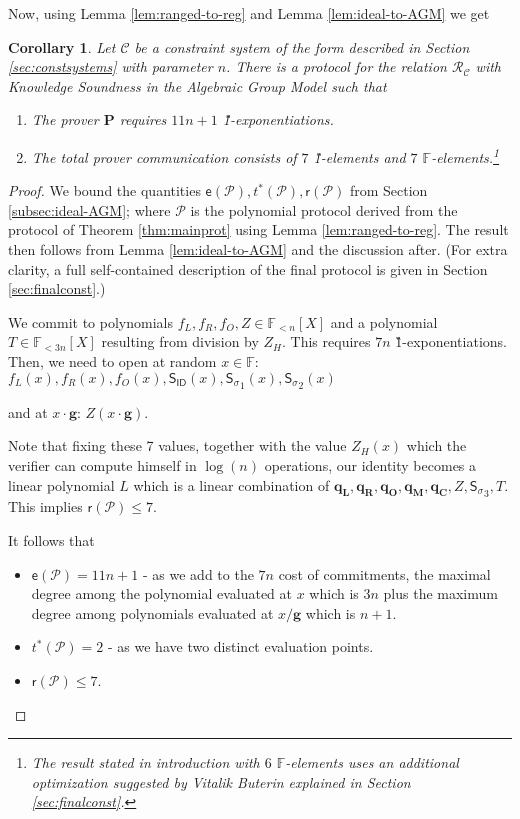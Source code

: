 \documentclass[11pt]{article} %
\newcommand{\F}{\ensuremath{\mathbb F}\xspace}
\newcommand{\proverexp}{\ensuremath{\mathsf{e}}\xspace}
\newcommand{\reducedelems}{\ensuremath{\mathsf{r}}\xspace}
\newcommand{\prv}{\ensuremath{\mathsf{\mathbf{P}}}\xspace}
\newcommand{\rel}{\ensuremath{\mathcal{R}}\xspace}
\newcommand{\hgen}{\ensuremath{\mathbf{g}}\xspace}
\newcommand{\polysofdeg}[1]{\ensuremath{\F_{< #1}[X]}\xspace}
\newcommand{\prot}{\ensuremath{\mathscr{P}}\xspace}
\newcommand{\sigpoly}{\ensuremath{\mathsf{S_{\sigma}}}\xspace}
\newcommand{\idpoly}{\ensuremath{\mathsf{S_{ID}}}\xspace}
\newcommand{\selleft}{\ensuremath{\mathbf{q_L}}\xspace}
\newcommand{\selright}{\ensuremath{\mathbf{q_R}}\xspace}
\newcommand{\selout}{\ensuremath{\mathbf{q_O}}\xspace}
\newcommand{\selmult}{\ensuremath{\mathbf{q_M}}\xspace}
\newcommand{\selconst}{\ensuremath{\mathbf{q_C}}\xspace}
\newcommand{\constsystem}{\ensuremath{\mathscr{C}}\xspace}
\newcommand{\relof}[1]{\ensuremath{\rel_{#1}}\xspace}
\newtheorem{corollary}[lemma]{Corollary}
\begin{document}
 
 Now, using Lemma \ref{lem:ranged-to-reg} and Lemma \ref{lem:ideal-to-AGM} we get
 \begin{corollary}\label{cor:final}
  Let \constsystem be a constraint system of the form described in Section \ref{sec:constsystems} with parameter $n$. There is a protocol for the relation \relof{\constsystem} with Knowledge Soundness in the Algebraic Group Model such that
   \begin{enumerate}
  \item The prover \prv requires $11n+1$ \G1-exponentiations.
  \item The total prover communication consists of $7$ \G1-elements and $7$ \F-elements.\footnote{The result stated in introduction with $6$ \F-elements uses an additional optimization suggested by Vitalik Buterin explained in Section \ref{sec:finalconst}.} 
 \end{enumerate}

 \end{corollary}
\begin{proof}
We bound the quantities $\proverexp(\prot),t^*(\prot),\reducedelems(\prot)$ from Section \ref{subsec:ideal-AGM}; where \prot is the polynomial protocol derived from the protocol of Theorem \ref{thm:mainprot} using Lemma \ref{lem:ranged-to-reg}. The result then follows from Lemma \ref{lem:ideal-to-AGM} and the discussion after. 
(For extra clarity, a full self-contained description of the final protocol is given in Section \ref{sec:finalconst}.)

We commit to polynomials $f_L,f_R,f_O,Z\in\polysofdeg{n}$ and a polynomial $T\in \polysofdeg{3n}$ resulting from division by $Z_{H}$.
This requires $7n$ \G1-exponentiations.
Then, we need to open at random $x\in \F$: $f_L(x),f_R(x),f_O(x),\idpoly(x),\sigpoly_1(x),\sigpoly_2(x)$

and at $x\cdot \hgen$:
$Z(x\cdot \hgen)$.

Note that fixing these 7 values, together with the value $Z_H(x)$ which the verifier can compute himself in $\log(n)$ operations, our identity becomes a linear polynomial $L$ which is a linear combination of $\selleft,\selright,\selout,\selmult,\selconst,Z,\sigpoly_3,T$. This implies $\reducedelems(\prot)\leq 7$.

It follows that
\begin{itemize}
 \item 
$\proverexp(\prot) = 11n+1$ -
as we add to the $7n$ cost of commitments, the maximal degree among the polynomial evaluated at $x$ which is $3n$ plus the maximum degree among polynomials evaluated at $x/\hgen$ which is $n+1$.
\item $t^*(\prot)=2$ - as we have two distinct evaluation points.
\item $\reducedelems(\prot)\leq 7$.

\end{itemize}


\end{proof}
\end{document}
